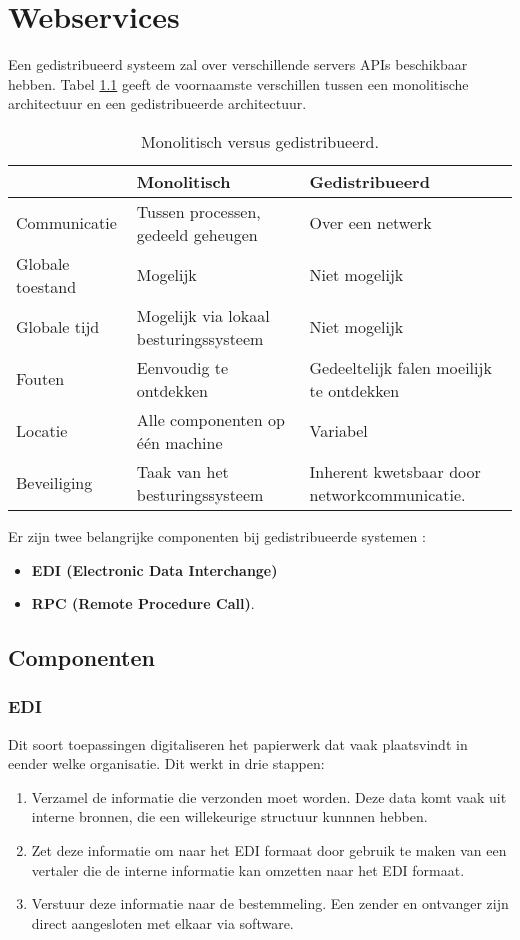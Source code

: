 \documentclass{report}
\begin{document}
\chapter{Webservices}
Een gedistribueerd systeem zal over verschillende servers APIs beschikbaar hebben. Tabel \ref{table:mono_vs_distributed} geeft de voornaamste verschillen tussen een monolitische architectuur en een gedistribueerde architectuur.
\begin{table}[ht]
	\begin{tabular}{l | l | l}
		& Monolitisch & Gedistribueerd \\
		\hline
		Communicatie & Tussen processen, gedeeld geheugen & Over een netwerk \\
		Globale toestand & Mogelijk & Niet mogelijk \\
		Globale tijd & Mogelijk via lokaal besturingssysteem & Niet mogelijk \\
		Fouten & Eenvoudig te ontdekken & Gedeeltelijk falen moeilijk te ontdekken \\
		Locatie & Alle componenten op één machine & Variabel \\
		Beveiliging & Taak van het besturingssysteem & Inherent kwetsbaar door networkcommunicatie.
	\end{tabular}
	\caption{Monolitisch versus gedistribueerd.}
	\label{table:mono_vs_distributed}
\end{table}

Er zijn twee belangrijke componenten bij gedistribueerde systemen :
\begin{itemize}
	\item \textbf{EDI  (Electronic Data Interchange)}
	\item \textbf{RPC (Remote Procedure Call)}.
\end{itemize}
 
\section{Componenten}
\subsection{EDI}
Dit soort toepassingen digitaliseren het papierwerk dat vaak plaatsvindt in eender welke organisatie. Dit werkt in drie stappen:
\begin{enumerate}
	\item Verzamel de informatie die verzonden moet worden. Deze data komt vaak uit interne bronnen, die een willekeurige structuur kunnnen hebben.
	\item Zet deze informatie om naar het EDI formaat door gebruik te maken van een vertaler die de interne informatie kan omzetten naar het EDI formaat.
	\item Verstuur deze informatie naar de bestemmeling. Een zender en ontvanger zijn direct aangesloten met elkaar via software.
\end{enumerate}
\end{document}
